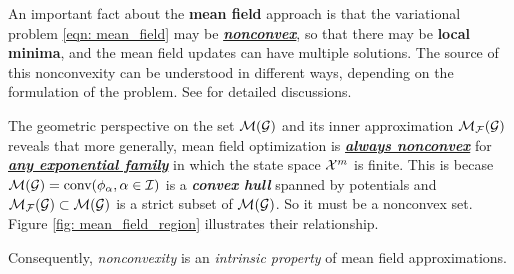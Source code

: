 \documentclass[11pt]{article}
\begin{document}
An important fact about the \textbf{mean field} approach is that the variational problem \eqref{eqn: mean_field} may be \underline{\textbf{\emph{nonconvex}}}, so that there may be \textbf{local minima}, and the mean field updates can have multiple solutions. The source of this nonconvexity can be understood in different ways, depending on the formulation of the problem. See \citep{wainwright2008graphical} for detailed discussions. 

The geometric perspective on the set ${\mathcal M}({\mathcal G})$ and its inner approximation ${\mathcal M}_{{\mathcal F}}({\mathcal G})$ reveals that more generally, mean field optimization is
  \underline{\emph{\textbf{always nonconvex}}} for \underline{\emph{\textbf{any exponential family}}} in which the state space ${\mathcal X}^m$ is finite. This is becase ${\mathcal M}({\mathcal G}) = \text{conv}(\phi_{\alpha}, \alpha \in {\mathcal I})$ is a \emph{\textbf{convex hull}} spanned by potentials and ${\mathcal M}_{{\mathcal F}}({\mathcal G}) \subset {\mathcal M}({\mathcal G})$ is a strict subset of ${\mathcal M}({\mathcal G})$. So it must be a nonconvex set. Figure \ref{fig: mean_field_region} illustrates their relationship.  

Consequently, \emph{nonconvexity} is an \emph{intrinsic property} of mean field approximations. 


\newpage


\end{document}
